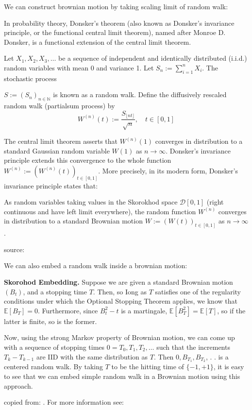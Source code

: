 We can construct brownian motion by taking scaling limit of random walk:

In probability theory, Donsker's theorem (also known as Donsker's invariance principle, or the functional central limit theorem), named after Monroe D. Donsker, is a functional extension of the central limit theorem.

Let $X_1, X_2, X_3, \ldots$ be a sequence of independent and identically distributed (i.i.d.) random variables with mean 0 and variance 1. Let $S_n:=\sum_{i=1}^n X_i$. The stochastic process

$S:=\left(S_n\right)_{n \in \mathbb{N}}$ is known as a random walk. Define the diffusively rescaled random walk (partialsum process) by
\[
W^{(n)}(t):=\frac{S_{\lfloor n t\rfloor}}{\sqrt{n}}, \quad t \in[0,1]
\]

The central limit theorem asserts that $W^{(n)}(1)$ converges in distribution to a standard Gaussian random variable $W(1)$ as $n \rightarrow \infty$. Donsker's invariance principle extends this convergence to the whole function $W^{(n)}:=\left(W^{(n)}(t)\right)_{t \in[0,1]}$. More precisely, in its modern form, Donsker's invariance principle states that: 

\begin{theorem}
As random variables taking values in the Skorokhod space $\mathcal{D}[0,1]$ (right continuous and have left limit everywhere), the random function $W^{(n)}$ converges in distribution to a standard Brownian motion $W:=(W(t))_{t \in[0,1]}$ as $n \rightarrow \infty$.
\end{theorem}
source: \cite{DonskerTheorem2021}

We can also embed a random walk inside a brownian motion:

\textbf{Skorohod Embedding.} Suppose we are given a standard Brownian motion $\left(B_t\right)$, and a stopping time $T$. Then, so Iong as $T$ satisfies one of the regularity conditions under which the Optional Stopping Theorem applies, we know that $\mathbb{E}\left[B_T\right]=0$. Furthermore, since $B_t^2-t$ is a martingale, $\mathbb{E}\left[B_T^2\right]=\mathbb{E}[T]$, so if the latter is finite, so is the former.

Now, using the strong Markov property of Brownian motion, we can come up with a sequence of stopping times $0=T_0, T_1, T_2, \ldots$ such that the increments $T_k-T_{k-1}$ are IID with the same distribution as $T$. Then $0, B_{T_1}, B_{T_2}$, . . is a centered random walk. By taking $T$ to be the hitting time of $\{-1,+1\}$, it is easy to see that we can embed simple random walk in a Brownian motion using this approach.

copied from: \cite{dominicyeoSkorohodEmbedding2016}. For more information see: \cite{oblojSkorokhodEmbeddingProblem2004}
